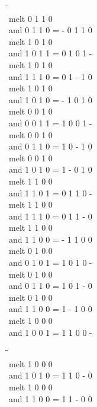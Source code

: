 \documentclass{article}
\begin{document}
\newpage
\begin{tabbing}
\hspace{3cm}\=\hspace{3cm}\=\hspace{3cm}\\[1cm]
melt  0  1  1  0 \\
and  0  1  1  0 \>
 =  -  0  1  1  0 \\[1mm]
melt  1  0  1  0 \\
and  1  0  1  1 \>
 =  0  1  0  1  - \\[1mm]
melt  1  0  1  0 \\
and  1  1  1  0 \>
 =  0  1  -  1  0 \\[1mm]
melt  1  0  1  0 \\
and  1  0  1  0 \>
 =  -  1  0  1  0 \\[1mm]
melt  0  0  1  0 \\
and  0  0  1  1 \>
 =  1  0  0  1  - \\[1mm]
melt  0  0  1  0 \\
and  0  1  1  0 \>
 =  1  0  -  1  0 \\[1mm]
melt  0  0  1  0 \\
and  1  0  1  0 \>
 =  1  -  0  1  0 \\[1mm]
melt  1  1  0  0 \\
and  1  1  0  1 \>
 =  0  1  1  0  - \\[1mm]
melt  1  1  0  0 \\
and  1  1  1  0 \>
 =  0  1  1  -  0 \\[1mm]
melt  1  1  0  0 \\
and  1  1  0  0 \>
 =  -  1  1  0  0 \\[1mm]
melt  0  1  0  0 \\
and  0  1  0  1 \>
 =  1  0  1  0  - \\[1mm]
melt  0  1  0  0 \\
and  0  1  1  0 \>
 =  1  0  1  -  0 \\[1mm]
melt  0  1  0  0 \\
and  1  1  0  0 \>
 =  1  -  1  0  0 \\[1mm]
melt  1  0  0  0 \\
and  1  0  0  1 \>
 =  1  1  0  0  - \\[1mm]
\end{tabbing}
\newpage
\begin{tabbing}
\hspace{3cm}\=\hspace{3cm}\=\hspace{3cm}\\[1cm]
melt  1  0  0  0 \\
and  1  0  1  0 \>
 =  1  1  0  -  0 \\[1mm]
melt  1  0  0  0 \\
and  1  1  0  0 \>
 =  1  1  -  0  0 \\[1mm]
\end{tabbing}
\newpage
\end{document}
